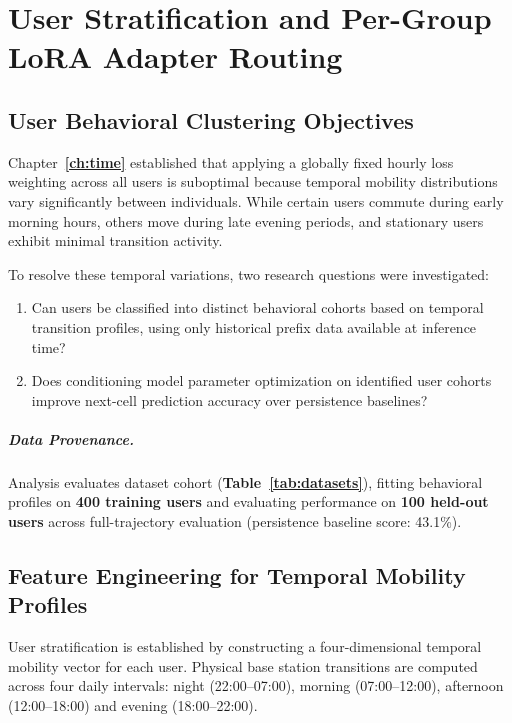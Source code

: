 \chapter{User Stratification and Per-Group LoRA Adapter Routing}
\label{ch:groups}

\section{User Behavioral Clustering Objectives}

Chapter~\textbf{\ref{ch:time}} established that applying a globally fixed hourly loss weighting across all users is suboptimal because temporal mobility distributions vary significantly between individuals. While certain users commute during early morning hours, others move during late evening periods, and stationary users exhibit minimal transition activity.

To resolve these temporal variations, two research questions were investigated:
\begin{enumerate}
  \item Can users be classified into distinct behavioral cohorts based on temporal transition profiles, using only historical prefix data available at inference time?
  \item Does conditioning model parameter optimization on identified user cohorts improve next-cell prediction accuracy over persistence baselines?
\end{enumerate}

\paragraph{Data Provenance.} Analysis evaluates dataset cohort \Dmob{} (\textbf{Table~\ref{tab:datasets}}), fitting behavioral profiles on \textbf{400 training users} and evaluating performance on \textbf{100 held-out users} across full-trajectory evaluation (persistence baseline score: 43.1\%).

\section{Feature Engineering for Temporal Mobility Profiles}

User stratification is established by constructing a four-dimensional temporal mobility vector for each user. Physical base station transitions are computed across four daily intervals: night (22:00--07:00), morning (07:00--12:00), afternoon (12:00--18:00) and evening (18:00--22:00).

